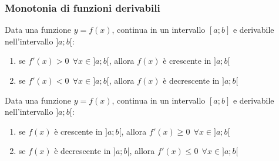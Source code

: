         \subsubsection{Monotonia di funzioni derivabili}
            \begin{shadedTheorem}
                Data una funzione $y=f(x)$, continua in un intervallo $[a;b]$ e derivabile nell'intervallo $]a;b[$: \begin{enumerate}
                    \item se $f'(x)>0 ~~\forall x \in ]a;b[$, allora $f(x)$ è crescente in $]a;b[$
                    \item se $f'(x)<0 ~~\forall x \in ]a;b[$, allora $f(x)$ è decrescente in $]a;b[$
                \end{enumerate} 
            \end{shadedTheorem}
            \begin{shadedTheorem}
                Data una funzione $y=f(x)$, continua in un intervallo $[a;b]$ e derivabile nell'intervallo $]a;b[$: \begin{enumerate}
                    \item se $f(x)$ è crescente in $]a;b[$, allora $f'(x)\geq0 ~~\forall x \in ]a;b[$
                    \item se $f(x)$ è decrescente in $]a;b[$, allora $f'(x)\leq0 ~~\forall x \in ]a;b[$
                \end{enumerate} 
            \end{shadedTheorem}

